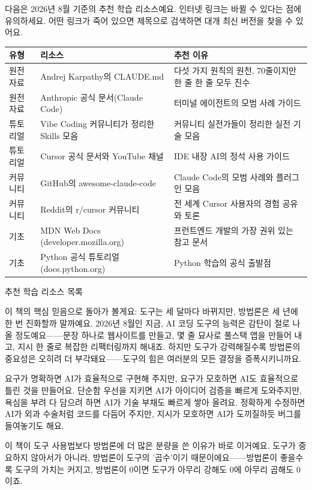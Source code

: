 
다음은 2026년 8월 기준의 추천 학습 리소스예요. 인터넷 링크는 바뀔 수 있다는 점에 유의하세요. 어떤 링크가 죽어 있으면 제목으로 검색하면 대개 최신 버전을 찾을 수 있어요.

\begin{center}
\begin{tabularx}{\linewidth}{|X|X|X|}
\hline
\textbf{유형} & \textbf{리소스} & \textbf{추천 이유} \tabularnewline
\hline
원전 자료 & Andrej Karpathy의 CLAUDE.md & 다섯 가지 원칙의 원천, 70줄이지만 한 줄 한 줄 모두 진수 \tabularnewline
원전 자료 & Anthropic 공식 문서(Claude Code) & 터미널 에이전트의 모범 사례 가이드 \tabularnewline
튜토리얼 & Vibe Coding 커뮤니티가 정리한 Skills 모음 & 커뮤니티 실전가들이 정리한 실전 기술 모음 \tabularnewline
튜토리얼 & Cursor 공식 문서와 YouTube 채널 & IDE 내장 AI의 정석 사용 가이드 \tabularnewline
커뮤니티 & GitHub의 awesome-claude-code & Claude Code의 모범 사례와 플러그인 모음 \tabularnewline
커뮤니티 & Reddit의 r/cursor 커뮤니티 & 전 세계 Cursor 사용자의 경험 공유와 토론 \tabularnewline
기초 & MDN Web Docs (developer.mozilla.org) & 프런트엔드 개발의 가장 권위 있는 참고 문서 \tabularnewline
기초 & Python 공식 튜토리얼(docs.python.org) & Python 학습의 공식 출발점 \tabularnewline
\hline
\end{tabularx}
\end{center}

\begin{center}\small\color{gray}추천 학습 리소스 목록\end{center}


이 책의 핵심 믿음으로 돌아가 볼게요: 도구는 세 달마다 바뀌지만, 방법론은 세 년에 한 번 진화할까 말까예요. 2026년 8월인 지금, AI 코딩 도구의 능력은 감탄이 절로 나올 정도예요——문장 하나로 웹사이트를 만들고, 몇 줄 묘사로 풀스택 앱을 만들어 내고, 지시 한 줄로 복잡한 리팩터링까지 해내죠. 하지만 도구가 강력해질수록 방법론의 중요성은 오히려 더 부각돼요——도구의 힘은 여러분의 모든 결정을 증폭시키니까요.

요구가 명확하면 AI가 효율적으로 구현해 주지만, 요구가 모호하면 AI도 효율적으로 틀린 것을 만들어요. 단순함 우선을 지키면 AI가 아이디어 검증을 빠르게 도와주지만, 욕심을 부려 다 담으려 하면 AI가 기술 부채도 빠르게 쌓아 올려요. 정확하게 수정하면 AI가 외과 수술처럼 코드를 다듬어 주지만, 지시가 모호하면 AI가 도끼질하듯 버그를 들여놓기도 해요.

이 책이 도구 사용법보다 방법론에 더 많은 분량을 쓴 이유가 바로 이거예요. 도구가 중요하지 않아서가 아니라, 방법론이 도구의 '곱수'이기 때문이에요——방법론이 좋을수록 도구의 가치는 커지고, 방법론이 0이면 도구가 아무리 강해도 0에 아무리 곱해도 0이죠.

